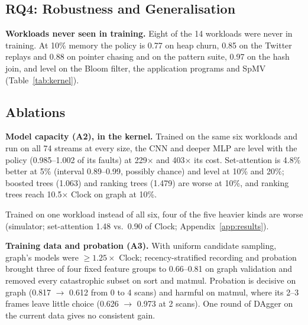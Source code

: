 \documentclass{article}
\newcommand{\clock}{Clock\xspace}
\newcommand{\finding}[1]{\textbf{#1}\hspace{0.4em}}
\begin{document}
\subsection{RQ4: Robustness and Generalisation}
\label{sec:eval-robust}

\finding{Workloads never seen in training.} Eight of the 14 workloads were never in
training. At 10\% memory the policy is 0.77 on heap churn, 0.85 on the Twitter replays and
0.88 on pointer chasing and on the pattern suite, 0.97 on the hash join, and level on the
Bloom filter, the application programs and SpMV (Table~\ref{tab:kernel}).


\subsection{Ablations}
\label{sec:eval-ablate}

\finding{Model capacity (A2), in the kernel.} Trained on the same six workloads and run on
all 74 streams at every size, the CNN and deeper MLP are level with the policy (0.985--1.002
of its faults) at 229$\times$ and 403$\times$ its cost. Set-attention is 4.8\% better at
5\% (interval 0.89--0.99, possibly chance) and level at 10\% and 20\%; boosted trees
(1.063) and ranking trees (1.479) are worse at 10\%, and ranking trees reach 10.5$\times$
\clock on graph at 10\%.

Trained on one workload instead of all six, four of the five heavier kinds are worse
(simulator; set-attention 1.48 vs.\ 0.90 of \clock; Appendix~\ref{app:results}).

\finding{Training data and probation (A3).} With uniform candidate sampling, graph's models
were $\geq1.25\times$ \clock; recency-stratified recording and probation brought three of
four fixed feature groups to 0.66--0.81 on graph validation and removed every catastrophic
subset on sort and matmul. Probation is decisive on graph (0.817 $\rightarrow$ 0.612 from
0 to 4 scans) and harmful on matmul, where its 2--3 frames leave little choice (0.626
$\rightarrow$ 0.973 at 2 scans). One round of DAgger on the current data gives no
consistent gain.
\end{document}
